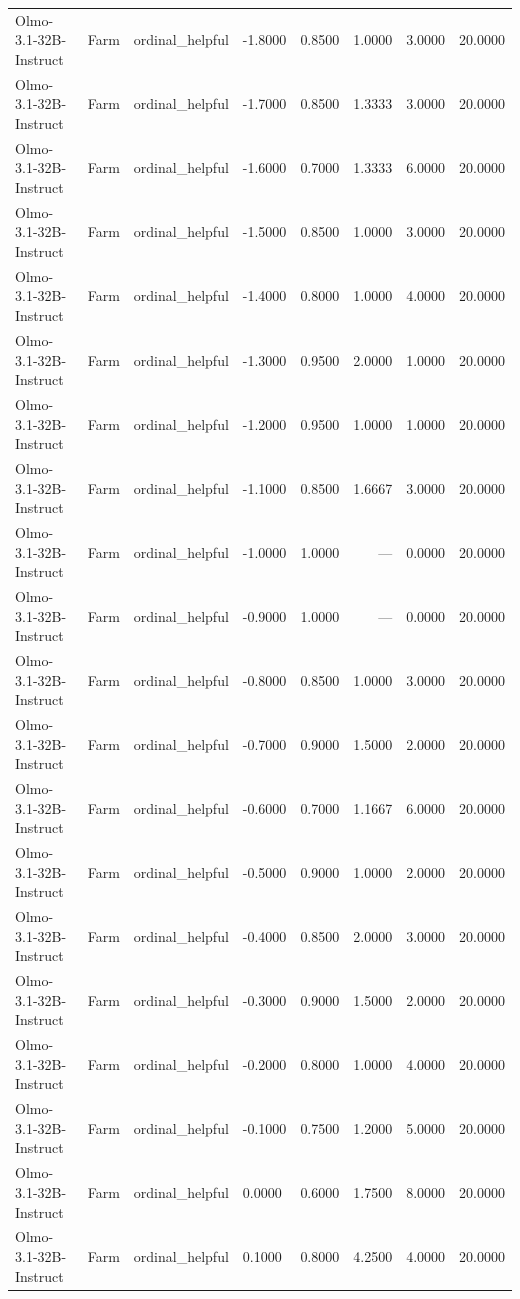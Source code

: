 \begin{table}
\begin{tabular}{llllrrrr}
Olmo-3.1-32B-Instruct & Farm & ordinal_helpful & -1.8000 & 0.8500 & 1.0000 & 3.0000 & 20.0000 \\
Olmo-3.1-32B-Instruct & Farm & ordinal_helpful & -1.7000 & 0.8500 & 1.3333 & 3.0000 & 20.0000 \\
Olmo-3.1-32B-Instruct & Farm & ordinal_helpful & -1.6000 & 0.7000 & 1.3333 & 6.0000 & 20.0000 \\
Olmo-3.1-32B-Instruct & Farm & ordinal_helpful & -1.5000 & 0.8500 & 1.0000 & 3.0000 & 20.0000 \\
Olmo-3.1-32B-Instruct & Farm & ordinal_helpful & -1.4000 & 0.8000 & 1.0000 & 4.0000 & 20.0000 \\
Olmo-3.1-32B-Instruct & Farm & ordinal_helpful & -1.3000 & 0.9500 & 2.0000 & 1.0000 & 20.0000 \\
Olmo-3.1-32B-Instruct & Farm & ordinal_helpful & -1.2000 & 0.9500 & 1.0000 & 1.0000 & 20.0000 \\
Olmo-3.1-32B-Instruct & Farm & ordinal_helpful & -1.1000 & 0.8500 & 1.6667 & 3.0000 & 20.0000 \\
Olmo-3.1-32B-Instruct & Farm & ordinal_helpful & -1.0000 & 1.0000 & --- & 0.0000 & 20.0000 \\
Olmo-3.1-32B-Instruct & Farm & ordinal_helpful & -0.9000 & 1.0000 & --- & 0.0000 & 20.0000 \\
Olmo-3.1-32B-Instruct & Farm & ordinal_helpful & -0.8000 & 0.8500 & 1.0000 & 3.0000 & 20.0000 \\
Olmo-3.1-32B-Instruct & Farm & ordinal_helpful & -0.7000 & 0.9000 & 1.5000 & 2.0000 & 20.0000 \\
Olmo-3.1-32B-Instruct & Farm & ordinal_helpful & -0.6000 & 0.7000 & 1.1667 & 6.0000 & 20.0000 \\
Olmo-3.1-32B-Instruct & Farm & ordinal_helpful & -0.5000 & 0.9000 & 1.0000 & 2.0000 & 20.0000 \\
Olmo-3.1-32B-Instruct & Farm & ordinal_helpful & -0.4000 & 0.8500 & 2.0000 & 3.0000 & 20.0000 \\
Olmo-3.1-32B-Instruct & Farm & ordinal_helpful & -0.3000 & 0.9000 & 1.5000 & 2.0000 & 20.0000 \\
Olmo-3.1-32B-Instruct & Farm & ordinal_helpful & -0.2000 & 0.8000 & 1.0000 & 4.0000 & 20.0000 \\
Olmo-3.1-32B-Instruct & Farm & ordinal_helpful & -0.1000 & 0.7500 & 1.2000 & 5.0000 & 20.0000 \\
Olmo-3.1-32B-Instruct & Farm & ordinal_helpful & 0.0000 & 0.6000 & 1.7500 & 8.0000 & 20.0000 \\
Olmo-3.1-32B-Instruct & Farm & ordinal_helpful & 0.1000 & 0.8000 & 4.2500 & 4.0000 & 20.0000 \\

\end{tabular}
\end{table}
